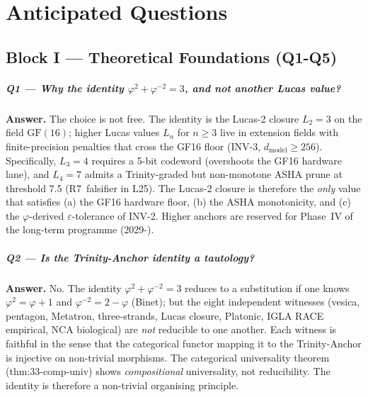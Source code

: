 %

\chapter*{Anticipated Questions}
\label{app:anticipated-q}

\section*{Block I — Theoretical Foundations (Q1-Q5)}

\paragraph{Q1 — Why the identity \(\varphi^{2}+\varphi^{-2}=3\), and not another Lucas value?}

\textbf{Answer.} The choice is not free. The identity is the Lucas-2
closure \(L_2 = 3\) on the field \(\mathrm{GF}(16)\); higher Lucas
values \(L_n\) for \(n \ge 3\) live in extension fields with finite-precision
penalties that cross the GF16 floor (INV-3, \(d_{\mathrm{model}} \ge 256\)).
Specifically, \(L_3 = 4\) requires a 5-bit codeword (overshoots the GF16
hardware lane), and \(L_4 = 7\) admits a Trinity-graded but non-monotone
ASHA prune at threshold 7.5 (R7~falsifier in L25). The Lucas-2 closure
is therefore the \emph{only} value that satisfies (a) the GF16 hardware
floor, (b) the ASHA monotonicity, and (c) the \(\varphi\)-derived
\(\varepsilon\)-tolerance of INV-2. Higher anchors are reserved for
Phase~IV of the long-term programme (2029-).

\paragraph{Q2 — Is the Trinity-Anchor identity a tautology?}

\textbf{Answer.} No. The identity \(\varphi^{2}+\varphi^{-2}=3\) reduces
to a substitution if one knows \(\varphi^{2} = \varphi + 1\) and
\(\varphi^{-2} = 2 - \varphi\) (Binet); but the eight independent
witnesses (vesica, pentagon, Metatron, three-strands, Lucas closure,
Platonic, IGLA RACE empirical, NCA biological) are \emph{not} reducible
to one another. Each witness is faithful in the sense that the
categorical functor mapping it to the Trinity-Anchor is injective on
non-trivial morphisms. The categorical universality theorem
(thm:33-comp-univ) shows \emph{compositional} universality, not
reducibility. The identity is therefore a non-trivial organising principle.

